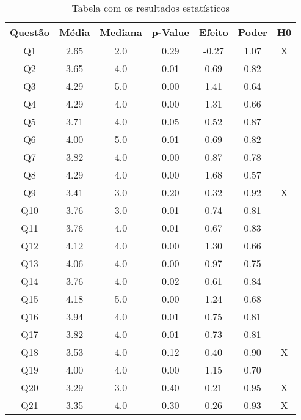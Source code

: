 \begin{table}[!ht]
    \centering
    \caption{Tabela com os resultados estatísticos}
    \label{tab:estatisticas}
    \footnotesize
    \begin{tabular}{|c|c|c|c|c|c|c|}
        \hline
        \cellcolor{green!25} \textbf{Questão} & \cellcolor{green!25} \textbf{Média} & \cellcolor{green!25} \textbf{Mediana} & \cellcolor{green!25} \textbf{p-Value} & \cellcolor{green!25} \textbf{Efeito} & \cellcolor{green!25} \textbf{Poder} & \cellcolor{green!25} \textbf{H0} \\
        \hline
        Q1 & 2.65 & 2.0 & 0.29 & -0.27 & 1.07 & X \\
        Q2 & 3.65 & 4.0 & 0.01 & 0.69 & 0.82 &  \\
        Q3 & 4.29 & 5.0 & 0.00 & 1.41 & 0.64 &  \\
        Q4 & 4.29 & 4.0 & 0.00 & 1.31 & 0.66 &  \\
        Q5 & 3.71 & 4.0 & 0.05 & 0.52 & 0.87 &  \\
        Q6 & 4.00 & 5.0 & 0.01 & 0.69 & 0.82 &  \\
        Q7 & 3.82 & 4.0 & 0.00 & 0.87 & 0.78 &  \\
        Q8 & 4.29 & 4.0 & 0.00 & 1.68 & 0.57 &  \\
        Q9 & 3.41 & 3.0 & 0.20 & 0.32 & 0.92 & X \\
        Q10 & 3.76 & 3.0 & 0.01 & 0.74 & 0.81 &  \\
        Q11 & 3.76 & 4.0 & 0.01 & 0.67 & 0.83 &  \\
        Q12 & 4.12 & 4.0 & 0.00 & 1.30 & 0.66 &  \\
        Q13 & 4.06 & 4.0 & 0.00 & 0.97 & 0.75 &  \\
        Q14 & 3.76 & 4.0 & 0.02 & 0.61 & 0.84 &  \\
        Q15 & 4.18 & 5.0 & 0.00 & 1.24 & 0.68 &  \\
        Q16 & 3.94 & 4.0 & 0.01 & 0.75 & 0.81 &  \\
        Q17 & 3.82 & 4.0 & 0.01 & 0.73 & 0.81 &  \\
        Q18 & 3.53 & 4.0 & 0.12 & 0.40 & 0.90 & X \\
        Q19 & 4.00 & 4.0 & 0.00 & 1.15 & 0.70 &  \\
        Q20 & 3.29 & 3.0 & 0.40 & 0.21 & 0.95 & X \\
        Q21 & 3.35 & 4.0 & 0.30 & 0.26 & 0.93 & X \\
        \hline
    \end{tabular}\normalsize
\end{table}



